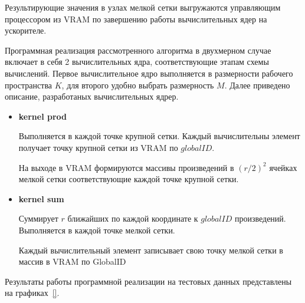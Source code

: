Результирующие значения в узлах мелкой сетки выгружаются управляющим процессором
из VRAM по завершению работы вычислительных ядер на ускорителе.

Программная реализация рассмотренного алгоритма в двухмерном случае
включает в себя 2 вычислительных ядра, соответствующие этапам схемы вычислений.
Первое вычислительное ядро выполняется в размерности рабочего пространства $K$,
для второго удобно выбрать размерность $M$.
Далее приведено описание, разработаных вычислительных ядрер.
\begin{itemize}
\item
  {\bf kernel prod}

  Выполняется в каждой точке крупной сетки.
  Каждый вычислительны элемент 
  получает точку крупной сетки
  из VRAM по $globalID$. 
  

  На выходе в VRAM
  формируются массивы произведений в $(r/2)^2$ ячейках мелкой сетки  
  соответствующие каждой точке крупной сетки.

  
\item
  {\bf kernel sum}

  Суммирует $r$ ближайших по каждой координате к $globalID$ произведений. 
  Выполняется в каждой точке мелкой сетки.
  
  
  Каждый вычислительный элемент записывает свою точку мелкой сетки в
  массив в VRAM по GlobalID
\end{itemize}


Результаты работы программной реализации на тестовых данных представлены на графиках~\ref{}.






